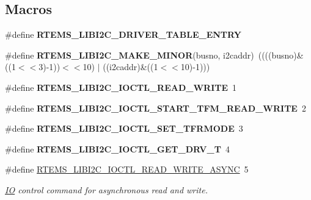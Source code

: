 \subsection*{Macros}
\begin{DoxyCompactItemize}
\item 
\#define {\bfseries R\+T\+E\+M\+S\+\_\+\+L\+I\+B\+I2\+C\+\_\+\+D\+R\+I\+V\+E\+R\+\_\+\+T\+A\+B\+L\+E\+\_\+\+E\+N\+T\+RY}
\item 
\mbox{\label{group__libi2c_gae5265338bfaad5c8e605d459bdd29205}} 
\#define {\bfseries R\+T\+E\+M\+S\+\_\+\+L\+I\+B\+I2\+C\+\_\+\+M\+A\+K\+E\+\_\+\+M\+I\+N\+OR}(busno,  i2caddr)~((((busno)\&((1$<$$<$3)-\/1))$<$$<$10) $\vert$ ((i2caddr)\&((1$<$$<$10)-\/1)))
\item 
\mbox{\label{group__libi2c_gac7e96bd4ca9d3813d68c4ff171080564}} 
\#define {\bfseries R\+T\+E\+M\+S\+\_\+\+L\+I\+B\+I2\+C\+\_\+\+I\+O\+C\+T\+L\+\_\+\+R\+E\+A\+D\+\_\+\+W\+R\+I\+TE}~1
\item 
\mbox{\label{group__libi2c_gafae66d5bc139b1a80351ccc148b22393}} 
\#define {\bfseries R\+T\+E\+M\+S\+\_\+\+L\+I\+B\+I2\+C\+\_\+\+I\+O\+C\+T\+L\+\_\+\+S\+T\+A\+R\+T\+\_\+\+T\+F\+M\+\_\+\+R\+E\+A\+D\+\_\+\+W\+R\+I\+TE}~2
\item 
\mbox{\label{group__libi2c_gab8f0c67d0afc6f193a8e80b3367cbc2b}} 
\#define {\bfseries R\+T\+E\+M\+S\+\_\+\+L\+I\+B\+I2\+C\+\_\+\+I\+O\+C\+T\+L\+\_\+\+S\+E\+T\+\_\+\+T\+F\+R\+M\+O\+DE}~3
\item 
\mbox{\label{group__libi2c_ga0b38a70cef4ea9dbf643ca283a9de83a}} 
\#define {\bfseries R\+T\+E\+M\+S\+\_\+\+L\+I\+B\+I2\+C\+\_\+\+I\+O\+C\+T\+L\+\_\+\+G\+E\+T\+\_\+\+D\+R\+V\+\_\+T}~4
\item 
\#define \mbox{\hyperlink{group__libi2c_gadae8be7dedd12dba0ca853f7f041fc1b}{R\+T\+E\+M\+S\+\_\+\+L\+I\+B\+I2\+C\+\_\+\+I\+O\+C\+T\+L\+\_\+\+R\+E\+A\+D\+\_\+\+W\+R\+I\+T\+E\+\_\+\+A\+S\+Y\+NC}}~5
\begin{DoxyCompactList}\small\item\em \mbox{\hyperlink{structIO}{IO}} control command for asynchronous read and write. \end{DoxyCompactList}\end{DoxyCompactItemize}
